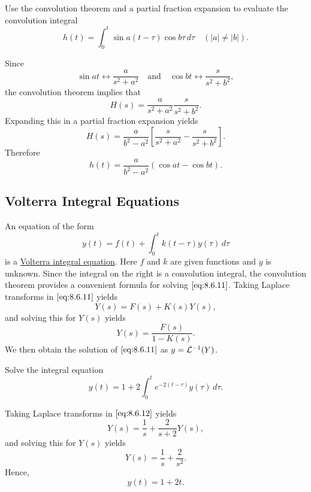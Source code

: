\documentclass{ximera}
\begin{document}
\begin{example}\label{example:8.6.6}
Use the convolution theorem and a partial fraction expansion to
evaluate the convolution integral
$$
h(t)=\int_0^t\sin a(t-\tau)\cos b\tau\,d\tau\quad (|a|\neq |b|).
$$
\begin{explanation}
Since
$$
\sin at\leftrightarrow \frac{a}{s^2+a^2}\quad\mbox{and}\quad
\cos bt\leftrightarrow \frac{s}{s^2+b^2},
$$
 the convolution theorem implies that
$$
H(s)=\frac{a}{s^2+a^2}\frac{s}{s^2+b^2}.
$$
Expanding this in a partial fraction expansion yields
$$
H(s)=\frac{a}{b^2-a^2}\left[\frac{s}{s^2+a^2}-\frac{s}{s^2+b^2}\right].
$$
Therefore
$$
h(t)=\frac{a}{b^2-a^2}\left(\cos at-\cos bt\right).
$$
\end{explanation}
\end{example}

\subsection*{Volterra Integral Equations}

An equation of the form
\begin{equation}\label{eq:8.6.11}
y(t)=f(t)+\int_0^t k(t-\tau) y(\tau)\,d\tau
\end{equation}
is a
\href{https://en.wikipedia.org/wiki/Volterra_integral_equation}{Volterra integral equation}.
Here $f$ and $k$ are given functions and $y$ is unknown. Since the
integral on the right is a convolution integral, the convolution
theorem provides a convenient formula for solving $\eqref{eq:8.6.11}$.
Taking Laplace transforms in $\eqref{eq:8.6.11}$ yields
$$
Y(s)=F(s)+K(s) Y(s),
$$
and solving this for $Y(s)$ yields
$$
Y(s)=\frac{F(s)}{1-K(s)}.
$$
We then obtain the solution of  $\eqref{eq:8.6.11}$ as
 $y={\cal L}^{-1}(Y)$.

\begin{example}\label{example:8.6.7}
 Solve the integral equation
\begin{equation}\label{eq:8.6.12}
y(t)=1+2\int_0^t e^{-2(t-\tau)} y(\tau)\,d\tau.
\end{equation}

\begin{explanation} Taking Laplace transforms in $\eqref{eq:8.6.12}$ yields
$$
Y(s)=\frac{1}{s}+\frac{2}{s+2} Y(s),
$$
and solving this for $Y(s)$ yields
$$
Y(s)=\frac{1}{s}+\frac{2}{s^2}.
$$
Hence,
$$
y(t)=1+2t.
$$
\end{explanation}
\end{example}
\end{document}
